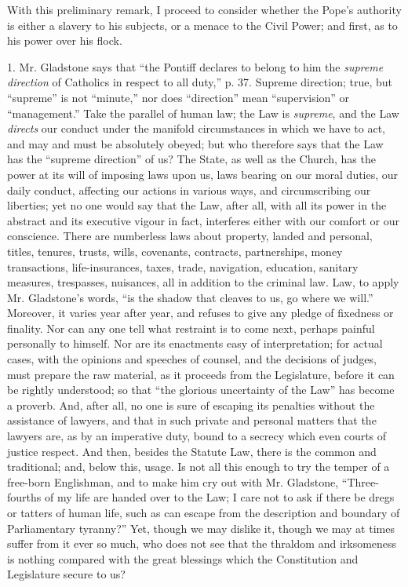 With this preliminary remark, I proceed to consider whether the
Pope's authority is either a slavery to his subjects, or a menace to the
Civil Power; and first, as to his power over his flock.

1. Mr. Gladstone says that ``the Pontiff declares to belong to
him the \emph{supreme direction} of Catholics in respect to all
duty,'' p. 37. Supreme direction; true, but ``supreme'' is
not ``minute,'' nor does ``direction'' mean
``supervision'' or ``management.'' Take the parallel of
human law; the Law is \emph{supreme}, and the Law \emph{directs} our
conduct under the manifold circumstances in which we have to act, and
may and must be absolutely obeyed; but who therefore says that the Law
has the ``supreme direction'' of us? The State, as well as the
Church, has the power at its will of imposing laws upon us, laws bearing
on our moral duties, our daily conduct, affecting our actions in various
ways, and circumscribing our liberties; yet no one would say that the
Law, after all, with all its power in the abstract and its executive
vigour in fact, interferes either with our comfort or our conscience.
There are numberless laws about property, landed and personal, titles,
tenures, trusts, wills, covenants, contracts, partnerships, money
transactions, life-insurances, taxes, trade, navigation, education,
sanitary measures, trespasses, nuisances, all in addition to the
criminal law. Law, to apply Mr. Gladstone's words, ``is the shadow
that cleaves to us, go where we will.'' Moreover, it varies year
after year, and refuses to give any pledge of fixedness or finality. Nor
can any one tell what restraint is to come next, perhaps painful
personally to himself. Nor are its enactments easy of interpretation;
for actual cases, with the opinions and speeches of counsel, and the
decisions of judges, must prepare the raw material, as it proceeds from
the Legislature, before it can be rightly understood; so that
``the glorious uncertainty of the Law'' has become a proverb.
And, after all, no one is sure of escaping its penalties without the
assistance of lawyers, and that in such private and personal matters
that the lawyers are, as by an imperative duty, bound to a secrecy which
even courts of justice respect. And then, besides the Statute Law, there
is the common and traditional; and, below this, usage. Is not all this
enough to try the temper of a free-born Englishman, and to make him cry
out with Mr. Gladstone, ``Three-fourths of my life are handed over
to the Law; I care not to ask if there be dregs or tatters of human
life, such as can escape from the description and boundary of
Parliamentary tyranny?'' Yet, though we may dislike it, though we
may at times suffer from it ever so much, who does not see that the
thraldom and irksomeness is nothing compared with the great blessings
which the Constitution and Legislature secure to us?

